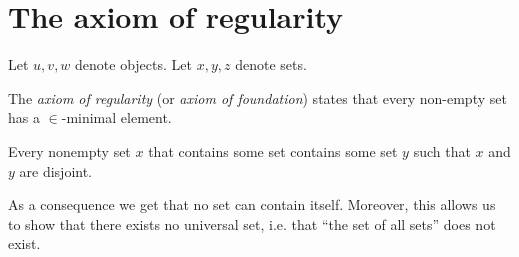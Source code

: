 \documentclass[../../set-theory.ftl.tex]{subfiles}
\begin{document}
  \section{The axiom of regularity}

  \begin{forthel}
  \end{forthel}

  \begin{forthel}
    Let $u,v,w$ denote objects.
    Let $x,y,z$ denote sets.
  \end{forthel}

  \noindent The \textit{axiom of regularity} (or \textit{axiom of foundation})
  states that every non-empty set has a $\in$-minimal element.

  \begin{forthel}
    \begin{axiom}[Regularity]\label{SetTheory_01_03_283644}
      Every nonempty set $x$ that contains some set contains some set $y$ such that $x$ and $y$ are disjoint.
    \end{axiom}
  \end{forthel}

  \noindent As a consequence we get that no set can contain itself.
  Moreover, this allows us to show that there exists no universal set, i.e. that
  \enquote{the set of all sets} does not exist.
\end{document}

